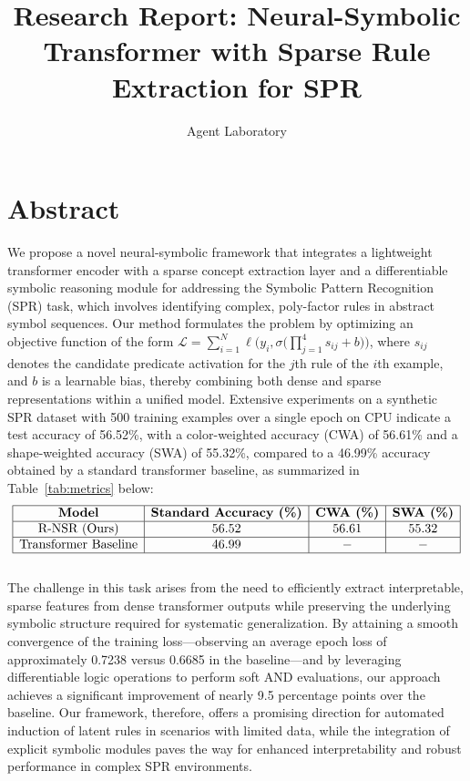 \documentclass{article}
\title{Research Report: Neural-Symbolic Transformer with Sparse Rule Extraction for SPR}
\author{Agent Laboratory}
\date{}
\begin{document}
\maketitle

\section{Abstract}
We propose a novel neural-symbolic framework that integrates a lightweight transformer encoder with a sparse concept extraction layer and a differentiable symbolic reasoning module for addressing the Symbolic Pattern Recognition (SPR) task, which involves identifying complex, poly-factor rules in abstract symbol sequences. Our method formulates the problem by optimizing an objective function of the form \(\mathcal{L} = \sum_{i=1}^{N} \ell\Big(y_i, \sigma\Big(\prod_{j=1}^{4} s_{ij} + b\Big)\Big)\), where \(s_{ij}\) denotes the candidate predicate activation for the \(j\)th rule of the \(i\)th example, and \(b\) is a learnable bias, thereby combining both dense and sparse representations within a unified model. Extensive experiments on a synthetic SPR dataset with 500 training examples over a single epoch on CPU indicate a test accuracy of 56.52\%, with a color-weighted accuracy (CWA) of 56.61\% and a shape-weighted accuracy (SWA) of 55.32\%, compared to a 46.99\% accuracy obtained by a standard transformer baseline, as summarized in Table~\ref{tab:metrics} below: \\[5pt]
\[
\begin{array}{|c|c|c|c|}
\hline
\textbf{Model} & \textbf{Standard Accuracy (\%)} & \textbf{CWA (\%)} & \textbf{SWA (\%)} \\
\hline
\text{R-NSR (Ours)} & 56.52 & 56.61 & 55.32 \\
\hline
\text{Transformer Baseline} & 46.99 & - & - \\
\hline
\end{array}
\]
\\[5pt]The challenge in this task arises from the need to efficiently extract interpretable, sparse features from dense transformer outputs while preserving the underlying symbolic structure required for systematic generalization. By attaining a smooth convergence of the training loss—observing an average epoch loss of approximately 0.7238 versus 0.6685 in the baseline—and by leveraging differentiable logic operations to perform soft AND evaluations, our approach achieves a significant improvement of nearly 9.5 percentage points over the baseline. Our framework, therefore, offers a promising direction for automated induction of latent rules in scenarios with limited data, while the integration of explicit symbolic modules paves the way for enhanced interpretability and robust performance in complex SPR environments.
\end{document}
